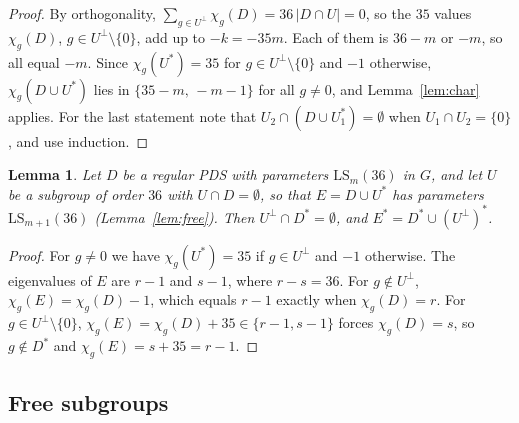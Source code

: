 \documentclass[11pt]{amsart}
\newtheorem{lemma}[theorem]{Lemma}
\theoremstyle{definition}
\newcommand{\LS}{\mathrm{LS}}
\begin{document}
\begin{proof}
By orthogonality, $\sum_{g\in U^\perp}\chi_g(D)=36\,|D\cap U|=0$, so the $35$ values $\chi_g(D)$, $g\in U^\perp\setminus\{0\}$, add up to $-k=-35m$. Each of them is $36-m$ or $-m$, so all equal $-m$. Since $\chi_g(U^*)=35$ for $g\in U^\perp\setminus\{0\}$ and $-1$ otherwise, $\chi_g(D\cup U^*)$ lies in $\{35-m,\,-m-1\}$ for all $g\ne0$, and Lemma~\ref{lem:char} applies. For the last statement note that $U_2\cap(D\cup U_1^*)=\emptyset$ when $U_1\cap U_2=\{0\}$, and use induction.
\end{proof}

\begin{lemma}\label{lem:dualspread}
Let $D$ be a regular PDS with parameters $\LS_m(36)$ in $G$, and let $U$ be a subgroup of order $36$ with $U\cap D=\emptyset$, so that $E=D\cup U^*$ has parameters $\LS_{m+1}(36)$ (Lemma~\ref{lem:free}). Then $U^\perp\cap D^*=\emptyset$, and $E^*=D^*\cup(U^\perp)^*$.
\end{lemma}

\begin{proof}
For $g\ne0$ we have $\chi_g(U^*)=35$ if $g\in U^\perp$ and $-1$ otherwise. The eigenvalues of $E$ are $r-1$ and $s-1$, where $r-s=36$. For $g\notin U^\perp$, $\chi_g(E)=\chi_g(D)-1$, which equals $r-1$ exactly when $\chi_g(D)=r$. For $g\in U^\perp\setminus\{0\}$, $\chi_g(E)=\chi_g(D)+35\in\{r-1,s-1\}$ forces $\chi_g(D)=s$, so $g\notin D^*$ and $\chi_g(E)=s+35=r-1$.
\end{proof}

\subsection{Free subgroups}
\end{document}
